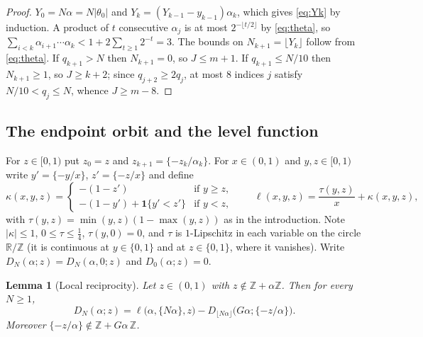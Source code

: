 \documentclass[11pt]{amsart}
\newtheorem{lemma}[theorem]{Lemma}
\theoremstyle{definition}
\numberwithin{equation}{section}
\newcommand{\R}{\mathbb{R}}
\newcommand{\Z}{\mathbb{Z}}
\newcommand{\fr}[1]{\{#1\}}
\newcommand{\ind}{\mathbf{1}}
\begin{document}
\begin{proof}
$Y_0=N\alpha=N|\theta_0|$ and $Y_k=(Y_{k-1}-y_{k-1})\alpha_k$, which gives \eqref{eq:Yk} by induction. A product of
$t$ consecutive $\alpha_j$ is at most $2^{-\lfloor t/2\rfloor}$ by \eqref{eq:theta}, so
$\sum_{i<k}\alpha_{i+1}\cdots\alpha_k<1+2\sum_{t\ge1}2^{-t}=3$. The bounds on $N_{k+1}=\lfloor Y_k\rfloor$ follow from
\eqref{eq:theta}. If $q_{k+1}>N$ then $N_{k+1}=0$, so $J\le m+1$. If $q_{k+1}\le N/10$ then $N_{k+1}\ge 1$, so $J\ge k+2$;
since $q_{j+2}\ge 2q_j$, at most $8$ indices $j$ satisfy $N/10<q_j\le N$, whence $J\ge m-8$.
\end{proof}

\subsection*{The endpoint orbit and the level function}
For $z\in[0,1)$ put $z_0=z$ and $z_{k+1}=\fr{-z_k/\alpha_k}$. For $x\in(0,1)$ and $y,z\in[0,1)$ write $y'=\fr{-y/x}$, $z'=\fr{-z/x}$ and define
\[
\kappa(x,y,z)=\begin{cases}-(1-z') & \text{if } y\ge z,\\ -(1-y')+\ind\{y'<z'\} & \text{if } y<z,\end{cases}\qquad
\ell(x,y,z)=\frac{\tau(y,z)}{x}+\kappa(x,y,z),
\]
with $\tau(y,z)=\min(y,z)(1-\max(y,z))$ as in the introduction. Note $|\kappa|\le1$, $0\le\tau\le\frac14$, $\tau(y,0)=0$, and $\tau$ is
$1$-Lipschitz in each variable on the circle $\R/\Z$ (it is continuous at $y\in\{0,1\}$ and at $z\in\{0,1\}$, where it vanishes). Write
$D_N(\alpha;z)=D_N(\alpha,0;z)$ and $D_0(\alpha;z)=0$.

\begin{lemma}[Local reciprocity]\label{lem:recip}
Let $z\in(0,1)$ with $z\notin\Z+\alpha\Z$. Then for every $N\ge1$,
\[
D_N(\alpha;z)=\ell\big(\alpha,\fr{N\alpha},z\big)-D_{\lfloor N\alpha\rfloor}\big(G\alpha;\fr{-z/\alpha}\big).
\]
Moreover $\fr{-z/\alpha}\notin\Z+G\alpha\,\Z$.
\end{lemma}
\end{document}
